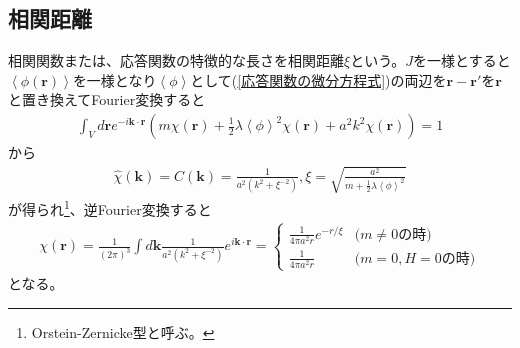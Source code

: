 \documentclass[a4paper,12pt, oneside, openany]{jsbook}
\begin{document}
\subsection{相関距離}
相関関数または、応答関数の特徴的な長さを相関距離$\xi$という。$J$を一様とすると$\left\langle \phi (\boldsymbol{r})\right\rangle $を一様となり$\left\langle \phi\right\rangle $として(\ref{応答関数の微分方程式})の両辺を$\boldsymbol{r}-\boldsymbol{r}'$を$\boldsymbol{r}$と置き換えてFourier変換すると
\begin{eqnarray}
  \int_V d\boldsymbol{r} e^{-i \boldsymbol{k}\cdot \boldsymbol{r}}\left(m \chi (\boldsymbol{r})+\frac{1}{2} \lambda \left\langle \phi\right\rangle^2 \chi (\boldsymbol{r}) +a^2 k^2 \chi (\boldsymbol{r}) \right) =1
\end{eqnarray}
から
\begin{eqnarray}
  \widehat{\chi }(\boldsymbol{k})=\widehat{C}(\boldsymbol{k})=\frac{1}{a^2(k^2+ \xi^{-2})}  ,\xi =\sqrt{\frac{a^2}{m+\frac{1}{2}\lambda\left\langle \phi\right\rangle^2 }} 
\end{eqnarray}
が得られ\footnote{Orstein-Zernicke型と呼ぶ。}、逆Fourier変換すると
\begin{eqnarray}
  \chi (\boldsymbol{r})=\frac{1}{(2\pi)^3}\int d\boldsymbol{k} \frac{1}{a^2(k^2+ \xi^{-2})} e^{i\boldsymbol{k}\cdot \boldsymbol{r}}= \begin{cases}
    \frac{1}{4\pi a^2 r }e^{-r/\xi} &   \text{($m\neq 0$の時)}  \\
    \frac{1}{4\pi a^2 r }     &   \text{($m=0,H=0$の時)}
\end{cases}
\end{eqnarray}
となる。
\end{document}
